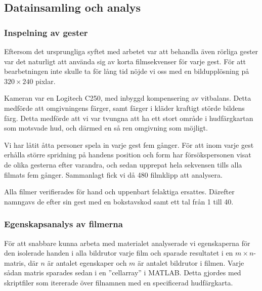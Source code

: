 \documentclass[../rapport_MVEX01-11-05]{subfiles}
\begin{document}
\subsection{Datainsamling och analys}

\subsubsection{Inspelning av gester}
Eftersom det ursprungliga syftet med arbetet var att behandla även rörliga
gester var det naturligt att använda sig av korta filmsekvenser för varje gest.
För att bearbetningen inte skulle ta för lång tid nöjde vi oss med en
bildupplösning på $320\times240$ pixlar.

Kameran var en Logitech C250, med inbyggd kompensering av vitbalans. Detta
medförde att omgivningens färger, samt färger i kläder kraftigt störde bildens 
färg. Detta medförde att vi var tvungna att ha ett stort område i hudfärgkartan
som motsvade hud, och därmed en så ren omgivning som möjligt.

Vi har låtit åtta personer spela in varje gest fem gånger.
För att inom varje gest erhålla större spridning på handens position och form
har försökspersonen visat de olika gesterna efter varandra, och sedan
upprepat hela sekvensen tills alla filmats fem gånger. Sammanlagt fick vi då 480
filmklipp att analysera.

Alla filmer verifierades för hand och uppenbart felaktiga ersattes. Därefter
namngavs de efter sin gest med en bokstavskod samt ett tal från 1 till 40.

\subsubsection{Egenskapsanalys av filmerna}
För att snabbare kunna arbeta med materialet analyserade vi
egenskaperna för den isolerade handen i alla bildrutor varje film och sparade
resultatet i en $m\times n$-matris, där $n$ är antalet egenskaper och $m$ är
antalet bildrutor i filmen. Varje sådan matris sparades sedan i en ''cellarray''
i MATLAB. Detta gjordes med skriptfiler som itererade över filnamnen
med en specificerad hudfärgkarta.
\end{document}
